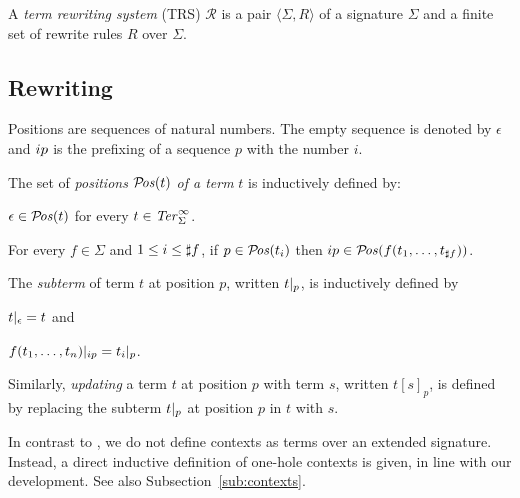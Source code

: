 \begin{definition}%
A \emph{term rewriting system} (TRS) $\mathcal{R}$ is a pair $\langle \Sigma,
R \rangle$ of a signature $\Sigma$ and a finite set of rewrite rules
$R$ over $\Sigma$.
\end{definition}


\subsection{Rewriting}

Positions are sequences of natural numbers. The empty sequence is
denoted by $\epsilon$ and $i p$ is the prefixing of a
sequence $p$ with the number $i$.

\begin{definition}%
  The set of \emph{positions} $\mathcal{P}\!\mathit{os}(t)$ \emph{of a term} $t$ is
  inductively defined by:
  \begin{compactenum}
    \item $\epsilon \in \mathcal{P}\!\mathit{os}(t)$ for every $t \in \mathit{Ter}_\Sigma^\infty$.
    \item For every $f \! \in \! \Sigma$ and $1 \le i \le \sharp f$, if $p
      \in \mathcal{P}\!\mathit{os}(t_i)$ then $i p \in \mathcal{P}\!\mathit{os}(f(t_1, \ldots,
      t_{\sharp f}))$.
  \end{compactenum}
  The \emph{subterm} of term $t$ at position $p$, written
  $t |_{p}$, is inductively defined by
  \begin{inparaenum}[(i)]
    \item $t |_{\epsilon} = t$ and
    \item $f(t_1, \ldots, t_n) |_{i p} =
      t_i |_{p}$.
  \end{inparaenum}
  Similarly, \emph{updating} a term $t$ at position $p$ with term $s$,
  written $t[s]_p$, is defined by replacing the subterm
  $t |_{p}$ at position $p$ in $t$ with $s$.
\end{definition}

In contrast to \cite{terese-03}, we do not define contexts as terms over an
extended signature. Instead, a direct inductive definition of one-hole
contexts is given, in line with our \Coq development. See also
Subsection~\ref{sub:contexts}.

